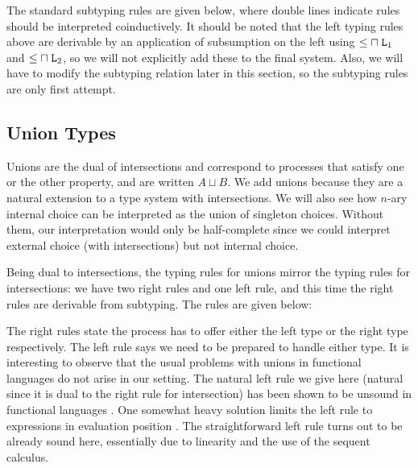 \documentclass[submission,copyright,creativecommons]{eptcs}
\renewcommand{\intersect}{\mathrel{\sqcap}}
\renewcommand{\union}{\mathrel{\sqcup}}
\begin{document}
The standard subtyping rules are given below, where double lines indicate rules should be interpreted coinductively. It should be noted that the left typing rules above are derivable by an application of subsumption on the left using $\Sub{\intersect\Left_1}$ and $\Sub{\intersect\Left_2}$, so we will not explicitly add these to the final system. Also, we will have to modify the subtyping relation later in this section, so the subtyping rules are only first attempt.



\subsection{Union Types}

Unions are the dual of intersections and correspond to processes that satisfy one or the other property, and are written $A \union B$. We add unions because they are a natural extension to a  type system with intersections. We will also see how $n$-ary internal choice can be interpreted as
the union of singleton choices. Without them, our interpretation would only be half-complete since we could interpret external choice (with intersections) but not internal choice.

Being dual to intersections, the typing rules for unions mirror the typing rules for intersections: we have two right rules and one left rule, and this time the right rules are derivable from subtyping. The rules are given below:


The right rules state the process has to offer either the left type or the right type respectively. The left rule says we need to be prepared to handle either type. It is interesting to observe that the usual problems with unions in functional languages do not arise in our setting. The natural left rule we give here (natural since it is dual to the right rule for intersection) has been shown to be unsound in functional languages \cite{Barbanera95ic}. One somewhat heavy solution limits the left rule to expressions in evaluation position \cite{DunfieldP04}. The straightforward left rule turns out to be already sound here, essentially due to linearity and the use of the sequent calculus.
\end{document}
